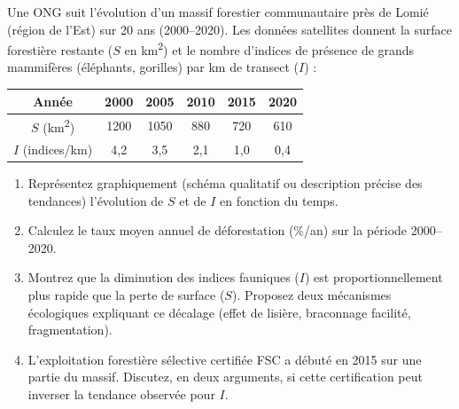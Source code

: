 \documentclass[11pt]{article}
\begin{document}
\begin{exercice}
Une ONG suit l'évolution d'un massif forestier communautaire près de Lomié (région de l'Est) sur 20 ans (2000--2020). Les données satellites donnent la surface forestière restante ($S$ en \si{\kilo\meter\squared}) et le nombre d'indices de présence de grands mammifères (éléphants, gorilles) par km de transect ($I$) :

\begin{tabular}{|c|c|c|c|c|c|}
\hline
\textbf{Année} & 2000 & 2005 & 2010 & 2015 & 2020 \\
\hline
$S$ (\si{\kilo\meter\squared}) & 1200 & 1050 & 880 & 720 & 610 \\
\hline
$I$ (indices/km) & 4,2 & 3,5 & 2,1 & 1,0 & 0,4 \\
\hline
\end{tabular}

\begin{enumerate}
\item Représentez graphiquement (schéma qualitatif ou description précise des tendances) l'évolution de $S$ et de $I$ en fonction du temps.
\item Calculez le taux moyen annuel de déforestation (\%/an) sur la période 2000--2020.
\item Montrez que la diminution des indices fauniques ($I$) est proportionnellement plus rapide que la perte de surface ($S$). Proposez deux mécanismes écologiques expliquant ce décalage (effet de lisière, braconnage facilité, fragmentation).
\item L'exploitation forestière sélective certifiée FSC a débuté en 2015 sur une partie du massif. Discutez, en deux arguments, si cette certification peut inverser la tendance observée pour $I$.
\end{enumerate}
\end{exercice}
\end{document}
